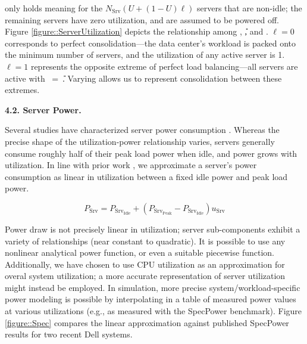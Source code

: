 \usrv only holds meaning for the $N_{\mathrm{Srv}}(U + (1-U)\ell)$  servers that are non-idle; the remaining servers have zero utilization, and are assumed to be powered off. Figure \ref{figure::ServerUtilization} depicts the relationship among \usrv, \U, and \el.
$\ell = 0$ corresponds to perfect consolidation---the data center's workload is packed onto the minimum number of servers, and the utilization of any active server is 1. $\ell = 1$ represents the opposite extreme of perfect load balancing---all servers are active with \usrv~=~\U.  Varying \el allows us to represent consolidation between these extremes. 




{\bf 4.2. Server Power.} 

Several studies have characterized server power consumption \cite{BarrosoBook09,Fan07,Meisner09,Rivoire08}.
Whereas the precise shape of the utilization-power relationship varies, servers generally consume roughly half of their peak load power when idle, and power grows with utilization.
In line with prior work \cite{Rivoire08}, we approximate a server's power consumption as linear in utilization between a fixed idle power and peak load power.

\begin{equation}
P_{\mathrm{Srv}} = P_{\mathrm{Srv}_{\mathrm{Idle}}} + ( P_{\mathrm{Srv}_{\mathrm{Peak}}} - P_{\mathrm{Srv}_{\mathrm{Idle}}}) u_{\mathrm{Srv}}
\end{equation}



Power draw is not precisely linear in utilization; server sub-components exhibit a variety of relationships (near constant to quadratic).
It is possible to use any nonlinear analytical power function, or even a suitable piecewise function.
Additionally, we have chosen to use CPU utilization as an approximation for overal system utilization; a more accurate representation of server utilization might instead be employed.
In simulation, more precise system/workload-specific power modeling is possible by interpolating in a table of measured power values at various utilizations (e.g., as measured with the SpecPower benchmark).
Figure \ref{figure::Spec} compares the linear approximation against published SpecPower results for two recent Dell systems.

